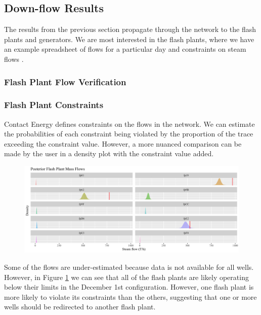 \documentclass[a4paper, 12pt]{article}
\begin{document}
\subsection{Down-flow Results}
The results from the previous section propagate through the network to the flash plants and generators. We are most interested in the flash plants, where we have an example spreadsheet of flows for a particular day and constraints on steam flows .

\subsubsection{Flash Plant Flow Verification}

\subsubsection{Flash Plant Constraints}
Contact Energy defines constraints on the flows in the network. We can estimate the probabilities of each constraint being violated by the proportion of the trace exceeding the constraint value. However, a more nuanced comparison can be made by the user in a density plot with the constraint value added.

\begin{figure}
\centering
  \includegraphics[width=\linewidth]{media/constraints}
  \label{fig:constraints}
\end{figure}

Some of the flows are under-estimated because data is not available for all wells. However, in Figure \ref{fig:constraints} we can see that all of the flash plants are likely operating below their limits in the December 1st configuration. However, one flash plant is more likely to violate its constraints than the others, suggesting that one or more wells should be redirected to another flash plant.
\end{document}
